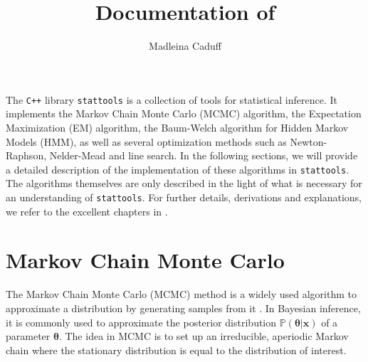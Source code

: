 \documentclass[a4paper,11pt]{article}
\title{Documentation of \stattools{}}
\author{Madleina Caduff}
\def\x{\boldsymbol{x}}
\def\btheta{\boldsymbol{\theta}}
\def\p{\mathbb{P}}
\def\stattools{\texttt{stattools}}
\def\Cpp{\texttt{C++}}
\begin{document}
\maketitle

\tableofcontents

\newpage

The \Cpp{} library \stattools{} is a collection of tools for statistical inference. It implements the Markov Chain Monte Carlo (MCMC) algorithm, the Expectation Maximization (EM) algorithm, the Baum-Welch algorithm for Hidden Markov Models (HMM), as well as several optimization methods such as Newton-Raphson, Nelder-Mead and line search. In the following sections, we will provide a detailed description of the implementation of these algorithms in \stattools{}. The algorithms themselves are only described in the light of what is necessary for an understanding of \stattools{}. For further details, derivations and explanations, we refer to the excellent chapters in \citet{Wegmann2019, barber2012, murphy2012}.

\section{Markov Chain Monte Carlo}
The Markov Chain Monte Carlo (MCMC) method is a widely used algorithm to approximate a distribution by generating samples from it \citep{barber2012, murphy2012}. In Bayesian inference, it is commonly used to approximate the posterior distribution $\p(\btheta | \x)$ of a parameter $\btheta$. The idea in MCMC is to set up an irreducible, aperiodic Markov chain where the stationary distribution is equal to the distribution of interest.
\end{document}
